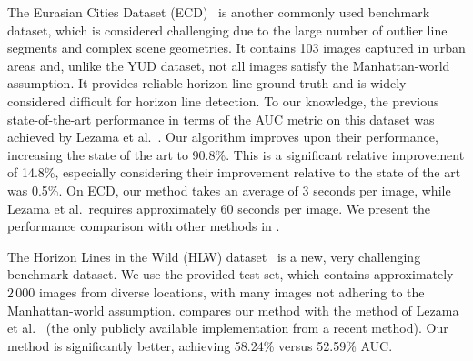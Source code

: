 
The Eurasian Cities Dataset (ECD)~\cite{geoparser2010} is another
commonly used benchmark dataset, which is considered challenging due
to the large number of outlier line segments and complex scene
geometries. It contains 103 images captured in urban areas and, unlike
the YUD dataset, not all images satisfy the Manhattan-world
assumption. It provides reliable horizon line ground truth and is
widely considered difficult for horizon line detection. To our
knowledge, the previous state-of-the-art performance in terms of the
AUC metric on this dataset was achieved by Lezama et
al.~\cite{alignment2014}. Our algorithm improves upon their
performance, increasing the state of the art to 90.8\%.  This is a
significant relative improvement of 14.8\%, especially considering
their improvement relative to the state of the art was 0.5\%.  On ECD,
our method takes an average of 3 seconds per image, while Lezama et
al.\ requires approximately 60 seconds per image. We present the
performance comparison with other methods in .


The Horizon Lines in the Wild (HLW)
dataset~\cite{authors2016deephorizon} is a new, very challenging
benchmark dataset. We use the provided test set, which contains
approximately $2\,000$ images from diverse locations, with many images
not adhering to the Manhattan-world assumption. 
compares our method with the method of Lezama et
al.~\cite{alignment2014} (the only publicly available implementation
from a recent method). Our method is significantly better, achieving
58.24\% versus 52.59\% AUC.

